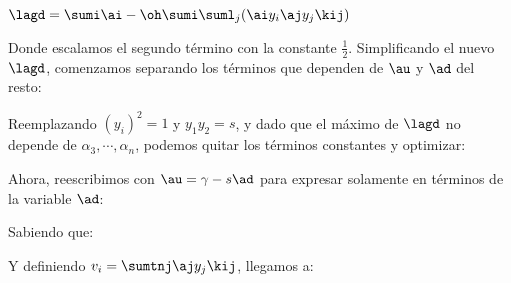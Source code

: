 $\lagd= \sumi \ai - \oh \sumi \suml_j  (\ai y_i \aj y_j \kij )$

Donde escalamos el segundo término con la constante $\frac{1}{2}$. Simplificando el nuevo $\lagd$, comenzamos separando los términos que dependen de $\au$ y $\ad$ del resto:


Reemplazando $(y_i)^2=1$ y $y_1 y_2 = s$,  y dado que el máximo de  $\lagd$ no depende de $\alpha_3,\cdots,\alpha_n$, podemos quitar los términos constantes y optimizar:



Ahora, reescribimos con $\au=\gamma-s \ad$ para expresar solamente en términos de la variable $\ad$:


Sabiendo que:


Y definiendo $v_i = \sumtnj	 \aj y_j \kij$, llegamos a:


